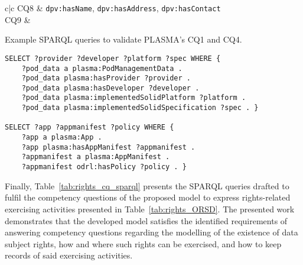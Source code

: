 \begin{table}[htp]
\begin{tabular}{c|c}
        \hline
        CQ8 & \texttt{dpv:hasName}, \texttt{dpv:hasAddress}, \texttt{dpv:hasContact} \\
        \hline
        CQ9 &  \\
    \end{tabular}
\end{table}

\begin{listing}[htp]
\caption{Example SPARQL queries to validate PLASMA's CQ1 and CQ4.}
\label{list:plasma_sparql_cq}
\begin{verbatim}
SELECT ?provider ?developer ?platform ?spec WHERE {
    ?pod_data a plasma:PodManagementData . 
    ?pod_data plasma:hasProvider ?provider . 
    ?pod_data plasma:hasDeveloper ?developer .
    ?pod_data plasma:implementedSolidPlatform ?platform .
    ?pod_data plasma:implementedSolidSpecification ?spec . }

SELECT ?app ?appmanifest ?policy WHERE {
    ?app a plasma:App . 
    ?app plasma:hasAppManifest ?appmanifest . 
    ?appmanifest a plasma:AppManifest .
    ?appmanifest odrl:hasPolicy ?policy . }
\end{verbatim}
\end{listing}

Finally, Table~\ref{tab:rights_cq_sparql} presents the SPARQL queries drafted to fulfil the competency questions of the proposed model to express rights-related exercising activities presented in Table~\ref{tab:rights_ORSD}.
The presented work demonstrates that the developed model satisfies the identified requirements of answering competency questions regarding the modelling of the existence of data subject rights, how and where such rights can be exercised, and how to keep records of said exercising activities.

